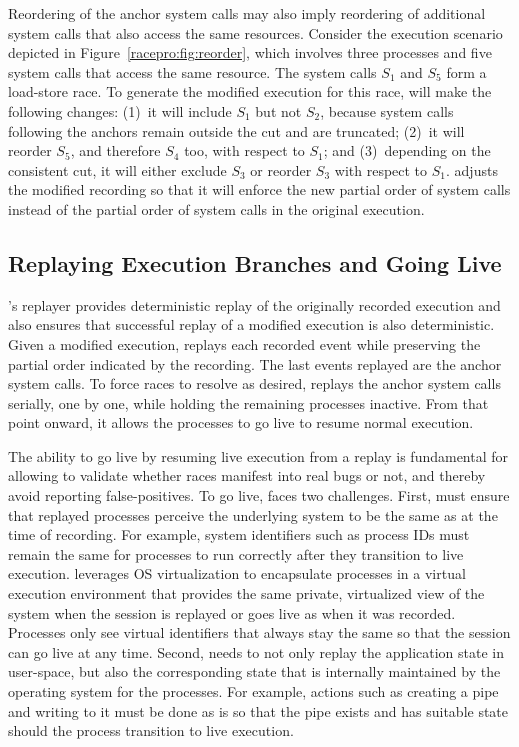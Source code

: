 Reordering of the anchor system calls may also imply reordering of
additional system calls that also access the same resources. Consider
the execution scenario depicted in Figure~\ref{racepro:fig:reorder}, which
involves three processes and five system calls that access the same
resource. The system calls $S_1$ and $S_5$ form a load-store race. To
generate the modified execution for this race, \racepro will make the
following changes: (1)~it will include $S_1$ but not $S_2$, because
system calls following the anchors remain outside the cut and are
truncated; (2)~it will reorder $S_5$, and therefore $S_4$ too, with
respect to $S_1$; and (3)~depending on the consistent cut, it will
either exclude $S_3$ or reorder $S_3$ with respect to $S_1$.
\racepro adjusts the modified recording so that it will enforce the new
partial order of system calls instead of the partial order of system
calls in the original execution.

\subsection{Replaying Execution Branches and Going Live}  \label{racepro:sec:reexec}

\racepro's replayer provides deterministic replay of the originally
recorded execution and also ensures that successful replay of a
modified execution is also deterministic.  Given a modified execution,
\racepro replays each recorded event while preserving the partial order
indicated by the recording. The last events replayed are the
anchor system calls. To force races to resolve as desired, \racepro
replays the anchor system calls serially, one by one, while holding
the remaining processes inactive.  From that point onward, it
allows the processes to go live to resume normal execution.

The ability to go live by resuming live execution from a replay is
fundamental for allowing \racepro to validate whether races manifest
into real bugs or not, and thereby avoid reporting false-positives.
To go live, \racepro faces two challenges.  First, \racepro
must ensure that replayed processes perceive the underlying system to
be the same as at the time of recording. For example, system
identifiers such as process IDs must remain the same for processes to
run correctly after they transition to live execution. \racepro leverages
OS virtualization to encapsulate processes in a virtual
execution environment that provides the same private, virtualized view
of the system when the session is replayed or goes live as when it was
recorded. Processes only see virtual
identifiers that always stay the same so that the session can go live
at any time.  Second, \racepro needs to not only replay the application
state in user-space, but also the corresponding state that is
internally maintained by the operating system for the processes.  For
example, actions such as creating a pipe and writing to it must be
done as is so that the pipe exists and has suitable state should the
process transition to live execution. 


